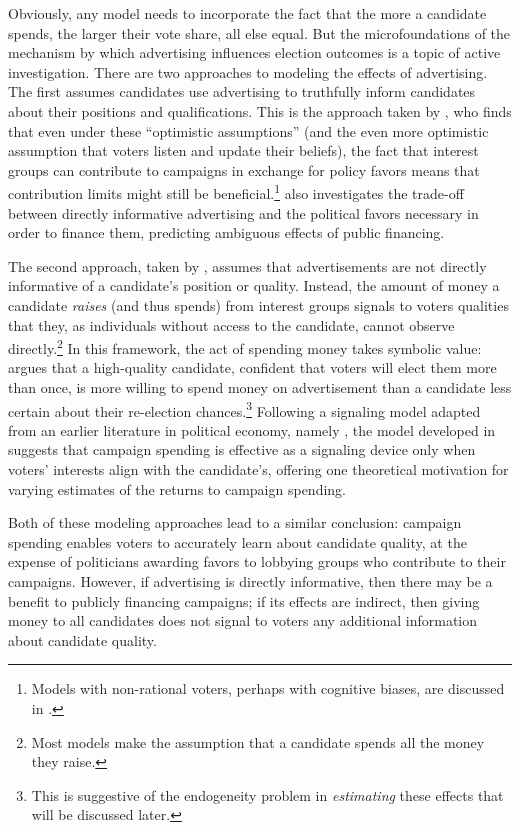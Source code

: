 \documentclass{article}
\begin{document}
Obviously, any model needs to incorporate the fact that the more a candidate spends, the larger their vote share, all else equal. But the microfoundations of the mechanism by which advertising influences election outcomes is a topic of active investigation. There are two approaches to modeling the effects of advertising. The first assumes candidates use advertising to truthfully inform candidates about their positions and qualifications. This is the approach taken by \cite{coate2004pareto}, who finds that even under these ``optimistic assumptions'' (and the even more optimistic assumption that voters listen and update their beliefs), the fact that interest groups can contribute to campaigns in exchange for policy favors means that contribution limits might still be beneficial.\footnote{ Models with non-rational voters, perhaps with cognitive biases, are discussed in \cite{prat2004rational}.} \cite{ashworth2006campaign} also investigates the trade-off between directly informative advertising and the political favors necessary in order to finance them, predicting ambiguous effects of public financing.

The second approach, taken by \cite{prat2002campaign}, assumes that advertisements are not directly informative of a candidate's position or quality. Instead, the amount of money a candidate \textit{raises} (and thus spends) from interest groups signals to voters qualities that they, as individuals without access to the candidate, cannot observe directly.\footnote{ Most models make the assumption that a candidate spends all the money they raise.} In this framework, the act of spending money takes symbolic value: \cite{prat2004rational} argues that a high-quality candidate, confident that voters will elect them more than once, is more willing to spend money on advertisement than a candidate less certain about their re-election chances.\footnote{ This is suggestive of the endogeneity problem in \textit{estimating} these effects that will be discussed later.} Following a signaling model adapted from an earlier literature in political economy, namely \cite{milgrom1986price}, the model developed in \cite{potters1997campaign} suggests that campaign spending is effective as a signaling device only when voters' interests align with the candidate's, offering one theoretical motivation for varying estimates of the returns to campaign spending. 

Both of these modeling approaches lead to a similar conclusion: campaign spending enables voters to accurately learn about candidate quality, at the expense of politicians awarding favors to lobbying groups who contribute to their campaigns. However, if advertising is directly informative, then there may be a benefit to publicly financing campaigns; if its effects are indirect, then giving money to all candidates does not signal to voters any additional information about candidate quality.
\end{document}
